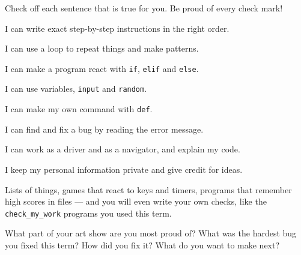 \begin{exercise}
Check off each sentence that is true for you. Be proud of every check mark!
\begin{checklist}
  \item I can write exact step-by-step instructions in the right order.
  \item I can use a loop to repeat things and make patterns.
  \item I can make a program react with \texttt{if}, \texttt{elif} and \texttt{else}.
  \item I can use variables, \texttt{input} and \texttt{random}.
  \item I can make my own command with \texttt{def}.
  \item I can find and fix a bug by reading the error message.
  \item I can work as a driver and as a navigator, and explain my code.
  \item I keep my personal information private and give credit for ideas.
\end{checklist}
\end{exercise}

\begin{tip}
Lists of things, games that react to keys and timers, programs that remember high scores in files --- and you will even write your own checks, like the \texttt{check\_my\_work} programs you used this term.
\end{tip}

\begin{vocab}
\end{vocab}

\begin{reflection}
What part of your art show are you most proud of?
What was the hardest bug you fixed this term? How did you fix it?
What do you want to make next?
\end{reflection}
